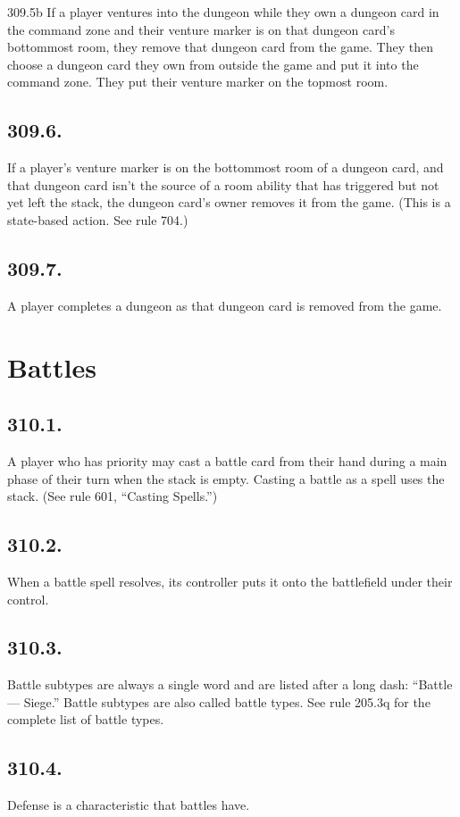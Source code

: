 309.5b If a player ventures into the dungeon while they own a dungeon card in the command zone and their venture marker is on that dungeon card’s bottommost room, they remove that dungeon card from the game. They then choose a dungeon card they own from outside the game and put it into the command zone. They put their venture marker on the topmost room.

\subsection*{309.6.}
If a player’s venture marker is on the bottommost room of a dungeon card, and that dungeon card isn’t the source of a room ability that has triggered but not yet left the stack, the dungeon card’s owner removes it from the game. (This is a state-based action. See rule 704.)

\subsection*{309.7.}
A player completes a dungeon as that dungeon card is removed from the game.

\section{Battles}
\subsection*{310.1.}
A player who has priority may cast a battle card from their hand during a main phase of their turn when the stack is empty. Casting a battle as a spell uses the stack. (See rule 601, “Casting Spells.”)

\subsection*{310.2.}
When a battle spell resolves, its controller puts it onto the battlefield under their control.

\subsection*{310.3.}
Battle subtypes are always a single word and are listed after a long dash: “Battle — Siege.” Battle subtypes are also called battle types. See rule 205.3q for the complete list of battle types.

\subsection*{310.4.}
Defense is a characteristic that battles have.


